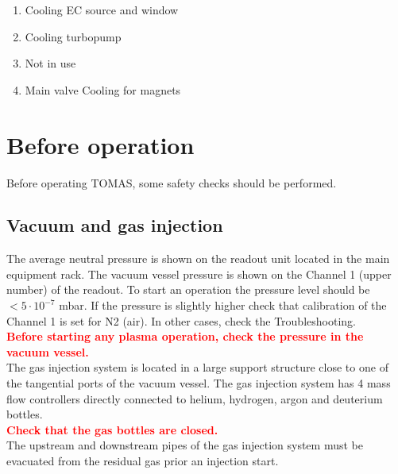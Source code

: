 \documentclass[fleqn,a4paper,20pt]{article}
\begin{document}
\begin{enumerate}
	\item Cooling EC source and window
	\item Cooling turbopump
	\item Not in use
	\item Main valve Cooling for magnets
\end{enumerate}

\newpage




\begin{minipage}{.68\textwidth}
	
\section{Before operation}%
	
	
Before operating TOMAS, some safety checks should be performed.

\subsection{Vacuum and gas injection}

The average neutral pressure is shown on the readout unit located in the main equipment rack.	The vacuum vessel pressure is shown on the Channel 1 (upper number) of the readout. To start an operation the pressure level should be $< 5\cdot 10^{-7}$ mbar. If the pressure is slightly higher check that calibration of the Channel 1 is set for N2 (air). In other cases, check the Troubleshooting.\\

\textcolor{red}{\textbf{Before starting any plasma operation, check the pressure in the vacuum vessel.}}\\

The gas injection system is located in a large support structure close to one of the tangential ports of the vacuum vessel. The gas injection system has 4 mass flow controllers directly connected to helium, hydrogen, argon and deuterium bottles.\\

\textcolor{red}{\textbf{Check that the gas bottles are closed.}}\\

The upstream and downstream pipes of the gas injection system must be evacuated from the residual gas prior an injection start.
\end{minipage}
\begin{minipage}{.02\textwidth}
	$\ $\\
\end{minipage}
\end{document}
